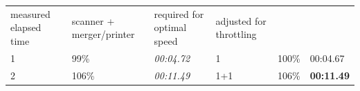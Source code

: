 \begin{longtable}[]{@{}llllll@{}}
\begin{minipage}[t]{0.14\columnwidth}
measured elapsed time\strut
\end{minipage} & \begin{minipage}[t]{0.14\columnwidth}\raggedright\strut
scanner + merger/printer\strut
\end{minipage} & \begin{minipage}[t]{0.14\columnwidth}\raggedright\strut
required for optimal speed\strut
\end{minipage} & \begin{minipage}[t]{0.14\columnwidth}\raggedright\strut
adjusted for throttling\strut
\end{minipage}\tabularnewline
\begin{minipage}[t]{0.14\columnwidth}\raggedright\strut
1\strut
\end{minipage} & \begin{minipage}[t]{0.14\columnwidth}\raggedright\strut
99\%\strut
\end{minipage} & \begin{minipage}[t]{0.14\columnwidth}\raggedright\strut
\emph{00:04.72}\strut
\end{minipage} & \begin{minipage}[t]{0.14\columnwidth}\raggedright\strut
1\strut
\end{minipage} & \begin{minipage}[t]{0.14\columnwidth}\raggedright\strut
100\%\strut
\end{minipage} & \begin{minipage}[t]{0.14\columnwidth}\raggedright\strut
00:04.67\strut
\end{minipage}\tabularnewline
\begin{minipage}[t]{0.14\columnwidth}\raggedright\strut
2\strut
\end{minipage} & \begin{minipage}[t]{0.14\columnwidth}\raggedright\strut
106\%\strut
\end{minipage} & \begin{minipage}[t]{0.14\columnwidth}\raggedright\strut
\emph{00:11.49}\strut
\end{minipage} & \begin{minipage}[t]{0.14\columnwidth}\raggedright\strut
1+1\strut
\end{minipage} & \begin{minipage}[t]{0.14\columnwidth}\raggedright\strut
106\%\strut
\end{minipage} & \begin{minipage}[t]{0.14\columnwidth}\raggedright\strut
\textbf{00:11.49}\strut

\end{minipage}
\end{longtable}
